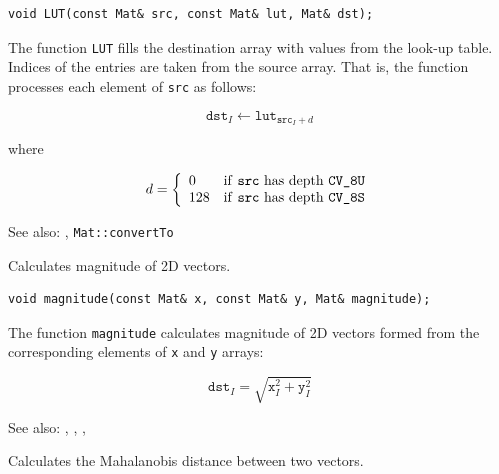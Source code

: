 \begin{lstlisting}
void LUT(const Mat& src, const Mat& lut, Mat& dst);
\end{lstlisting}
\begin{description}
\end{description}

The function \texttt{LUT} fills the destination array with values from the look-up table. Indices of the entries are taken from the source array. That is, the function processes each element of \texttt{src} as follows:

\[
\texttt{dst}_I \leftarrow \texttt{lut}_{\texttt{src}_I + d}
\]

where

\[
d = \left\{ \begin{array}{l l} 0 & \mbox{if \texttt{src} has depth \texttt{CV\_8U}}\\ 128 & \mbox{if \texttt{src} has depth \texttt{CV\_8S}}\\ \end{array} \right.
\]

See also: , \texttt{Mat::convertTo}

\label{magnitude}
Calculates magnitude of 2D vectors.

\begin{lstlisting}
void magnitude(const Mat& x, const Mat& y, Mat& magnitude);
\end{lstlisting}
\begin{description}
\end{description}

The function \texttt{magnitude} calculates magnitude of 2D vectors formed from the corresponding elements of \texttt{x} and \texttt{y} arrays:

\[
\texttt{dst}_I = \sqrt{\texttt{x}_I^2 + \texttt{y}_I^2}
\]

See also: , , , 


\label{Mahalanobis}
Calculates the Mahalanobis distance between two vectors.

